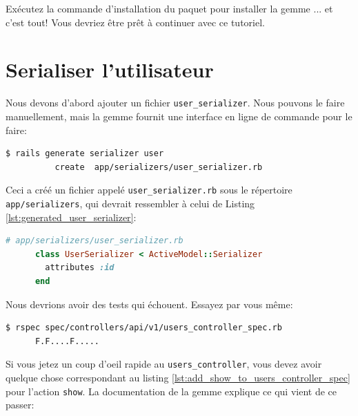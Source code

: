 \documentclass[]{report}
\begin{document}
    Exécutez la commande d'installation du paquet pour installer la gemme ... et c'est tout! Vous devriez être prêt à continuer avec ce tutoriel.

  \section{Serialiser l'utilisateur}\label{sec:serialize_user}

    Nous devons d'abord ajouter un fichier \verb|user_serializer|. Nous pouvons le faire manuellement, mais la gemme fournit une interface en ligne de commande pour le faire:

    \begin{scriptsize}
      \begin{lstlisting}[language=bash]
      $ rails generate serializer user
          create  app/serializers/user_serializer.rb
      \end{lstlisting}
    \end{scriptsize}

    Ceci a créé un fichier appelé \verb|user_serializer.rb| sous le répertoire \verb|app/serializers|, qui devrait ressembler à celui de Listing \ref{lst:generated_user_serializer}:

    \begin{scriptsize}
      \begin{lstlisting}[language=ruby, caption={Sérialsateur d'utilisateurs généré}, label={lst:generated_user_serializer}]
      # app/serializers/user_serializer.rb
      class UserSerializer < ActiveModel::Serializer
        attributes :id
      end
      \end{lstlisting}
    \end{scriptsize}

    Nous devrions avoir des tests qui échouent. Essayez par vous même:

    \begin{scriptsize}
      \begin{lstlisting}[language=bash]
      $ rspec spec/controllers/api/v1/users_controller_spec.rb
      F.F....F.....
      \end{lstlisting}
    \end{scriptsize}

    Si vous jetez un coup d'oeil rapide au \verb|users_controller|, vous devez avoir quelque chose correspondant au listing \ref{lst:add_show_to_users_controller_spec} pour l'action \verb|show|. La documentation de la gemme explique ce qui vient de ce passer:
\end{document}
